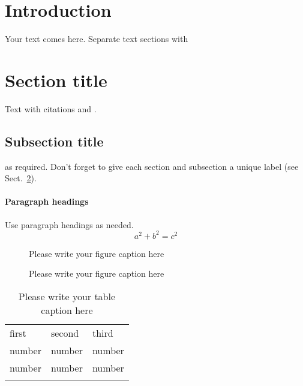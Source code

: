 \documentclass[fist]{svjour3}
\begin{document}
\section{Introduction}
\label{intro}
Your text comes here. Separate text sections with
\section{Section title}
\label{sec:1}
Text with citations \cite{RefB} and \cite{RefJ}.
\subsection{Subsection title}
\label{sec:2}
as required. Don't forget to give each section
and subsection a unique label (see Sect.~\ref{sec:1}).
\paragraph{Paragraph headings} Use paragraph headings as needed.
\begin{equation}
a^2+b^2=c^2
\end{equation}

\begin{figure}
%
\caption{Please write your figure caption here}
\label{fig:1}       %
\end{figure}
%
\begin{figure*}
%
\caption{Please write your figure caption here}
\label{fig:2}       %
\end{figure*}
%
\begin{table}
\caption{Please write your table caption here}
\label{tab:1}       %
\begin{tabular}{lll}
\hline\noalign{\smallskip}
first & second & third  \\
\noalign{\smallskip}\hline\noalign{\smallskip}
number & number & number \\
number & number & number \\
\noalign{\smallskip}\hline
\end{tabular}
\end{table}
\end{document}
